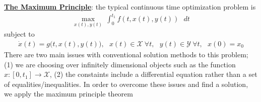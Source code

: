 \documentclass{article}
\begin{document}
\vspace{2.5mm}
\par \underline{\bf{The Maximum Principle}}: the typical continuous time optimization problem is
\begin{gather*} \max_{x(t), y(t)} \ \int_{0}^{t_{1}} f (t,x(t), y(t)) \ \ \ dt \end{gather*}
subject to
\begin{gather*} \dot{x}(t) = g\big(t, x(t), y(t)\big), \ \ \ x(t) \in \mathcal{X} \ \forall t, \ \ \ y(t) \in \mathcal{Y} \ \forall t, \ \ \ x(0) = x_{0} \end{gather*}
There are two main issues with conventional solution methods to this problem; (1) we are choosing over infinitely dimensional objects such as the function $x: [0, t_{1}] \rightarrow \mathcal{X}$, (2) the constaints include a differential equation rather than a set of equalities/inequalities. In order to overcome these issues and find a solution, we apply the maximum principle theorem
\end{document}
